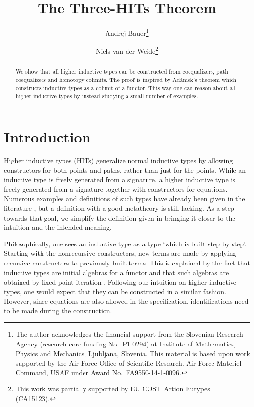 \documentclass[a4paper,UKenglish]{lipics-v2016}
\title{The Three-HITs Theorem}
\author[1]{Andrej Bauer\thanks{
The author acknowledges the financial support from the Slovenian Research Agency (research core funding No.~P1-0294) at Institute of Mathematics, Physics and Mechanics, Ljubljana, Slovenia. This material is based upon work supported by the Air Force Office of Scientific Research, Air Force Materiel Command, USAF under Award No.~FA9550-14-1-0096.}}
\author[2]{Niels van der Weide\thanks{This work was partially supported by EU COST Action Eutypes (CA15123).}}
\affil[1]{University of Ljubljana, Slovenia\\
  \texttt{Andrej.Bauer@andrej.com}}
\affil[2]{Department of Computer Science, Radboud University, Nijmegen, The Netherlands\\
  \texttt{nweide@cs.ru.nl}}
\begin{document}
\maketitle

\begin{abstract}
We show that all higher inductive types can be constructed from coequalizers, path coequalizers and homotopy colimits.
The proof is inspired by Ad\'amek's theorem which constructs inductive types as a colimit of a functor.
This way one can reason about all higher inductive types by instead studying a small number of examples.
 \end{abstract}

\section{Introduction}
Higher inductive types (HITs) generalize normal inductive types by allowing constructors for both points and paths, rather than just for the points.
While an inductive type is freely generated from a signature, a higher inductive type is freely generated from a signature together with constructors for equations.
Numerous examples and definitions of such types have already been given in the literature \cite{altenkirch2016quotient,awodey2012inductive,basoldhigher,sojakova2015higher,hottbook}, but a definition with a good metatheory is still lacking.
As a step towards that goal, we simplify the definition given in \cite{basoldhigher} bringing it closer to the intuition and the intended meaning.

Philosophically, one sees an inductive type as a type `which is built step by step'.
Starting with the nonrecursive constructors, new terms are made by applying recursive constructors to previously built terms.
This is explained by the fact that inductive types are initial algebras for a functor \cite{dybjer1994inductive,dybjer2003induction} and that such algebras are obtained by fixed point iteration \cite{adamek1974free}.
Following our intuition on higher inductive types, one would expect that they can be constructed in a similar fashion.
However, since equations are also allowed in the specification, identifications need to be made during the construction.
\end{document}
